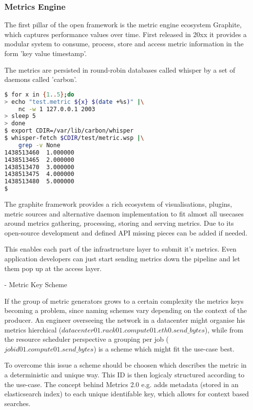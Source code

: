 \subsubsection{Metrics Engine}
The first pillar of the open framework is the metric engine ecosystem Graphite, which captures performance values over time. 
First released in 20xx it provides a modular system to consume, process, store and access metric information in the form 'key value timestamp'.

The metrics are persisted in round-robin databases called whisper by a set of daemons called 'carbon'.

\begin{lstlisting}[language=bash,
    caption={Sending and receiving metrics using carbon in combination with a whisper file backend.},
    label={lst:carbon_wsp}]
$ for x in {1..5};do
> echo "test.metric ${x} $(date +%s)" |\
    nc -w 1 127.0.0.1 2003
> sleep 5
> done
$ export CDIR=/var/lib/carbon/whisper
$ whisper-fetch $CDIR/test/metric.wsp |\
    grep -v None
1438513460	1.000000
1438513465	2.000000
1438513470	3.000000
1438513475	4.000000
1438513480	5.000000
$
\end{lstlisting}

The graphite framework provides a rich ecosystem of visualisations, plugins, metric sources and alternative daemon implementation to fit almost
all usecases around metrics gathering, processing, storing and serving metrics. Due to its open-source development and defined API missing pieces
can be added if needed.

This enables each part of the infrastructure layer to submit it's metrics. Even application developers can just start sending metrics down the pipeline and
let them pop up at the access layer.

- Metric Key Scheme

If the group of metric generators grows to a certain complexity the metrics keys becoming a problem, since naming schemes vary depending on the context of
the producer. An engineer overseeing the network in a datacenter might organise his metrics hierchical ($datacenter01.rack01.compute01.eth0.send\_bytes$), while from the
resource scheduler perspective a grouping per job ($jobid01.compute01.send\_bytes$) is a scheme which might fit the use-case best.

To overcome this issue a scheme should be choosen which describes the metric in a deterministic and unique way. This ID is then logicaly structured according to the use-case.
The concept behind Metrics 2.0 e.g. adds metadata (stored in an elasticsearch index) to each unique identifable key, which allows for context based searches.

